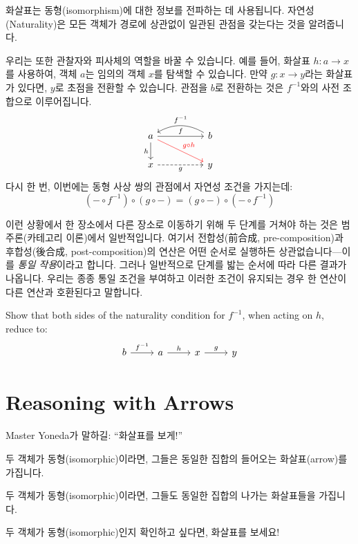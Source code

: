 \documentclass[DaoFP]{subfiles}
\begin{document}
화살표는 동형(isomorphism)에 대한 정보를 전파하는 데 사용됩니다. 자연성(Naturality)은 모든 객체가 경로에 상관없이 일관된 관점을 갖는다는 것을 알려줍니다.

우리는 또한 관찰자와 피사체의 역할을 바꿀 수 있습니다. 예를 들어, 화살표 $h \colon a \to x$를 사용하여, 객체 $a$는 임의의 객체 $x$를 탐색할 수 있습니다. 만약 $g \colon x \to y$라는 화살표가 있다면, $y$로 초점을 전환할 수 있습니다. 관점을 $b$로 전환하는 것은 $f^{-1}$와의 사전 조합으로 이루어집니다.
\[
 \begin{tikzcd}
 a
 \arrow[rr, "f"]
 \arrow[d, "h"']
 \arrow[rrd, red, "g\circ h"]
 && b
  \arrow[ll, bend right,  "f^{-1}"']
 \\
 x
 \arrow[rr, dashed, "g"']
  && y
 \end{tikzcd}
\]
다시 한 번, 이번에는 동형 사상 쌍의 관점에서 자연성 조건을 가지는데:
\[(- \circ f^{-1}) \circ (g \circ -) = (g \circ -) \circ (- \circ f^{-1}) \]

이런 상황에서 한 장소에서 다른 장소로 이동하기 위해 두 단계를 거쳐야 하는 것은 범주론(카테고리 이론)에서 일반적입니다. 여기서 전합성(前合成, pre-composition)과 후합성(後合成, post-composition)의 연산은 어떤 순서로 실행하든 상관없습니다---이를 \emph{통일 작용}이라고 합니다. 그러나 일반적으로 단계를 밟는 순서에 따라 다른 결과가 나옵니다. 우리는 종종 통일 조건을 부여하고 이러한 조건이 유지되는 경우 한 연산이 다른 연산과 호환된다고 말합니다.

\begin{exercise}
Show that both sides of the naturality condition for $f^{-1}$, when acting on $h$, reduce to:
\[
 \begin{tikzcd}
 b \arrow[r, "f^{-1}"] &a \arrow[r, "h"] & x \arrow[r, "g"] & y
\end{tikzcd}
\]

\end{exercise}

\section{Reasoning with Arrows}

Master Yoneda가 말하길: ``화살표를 보게!''

두 객체가 동형(isomorphic)이라면, 그들은 동일한 집합의 들어오는 화살표(arrow)를 가집니다.

두 객체가 동형(isomorphic)이라면, 그들도 동일한 집합의 나가는 화살표들을 가집니다.

두 객체가 동형(isomorphic)인지 확인하고 싶다면, 화살표를 보세요!
\end{document}
